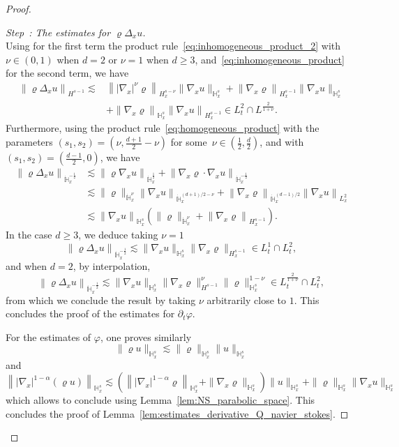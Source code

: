\documentclass[10pt]{amsart}
\theoremstyle{definition}\newtheorem{defi}[theo]{Definition}\newtheorem{rema}[theo]{Remark}\newtheorem{exam}[theo]{Example}\newtheorem{exem}[theo]{Example}\newtheorem{nota}[theo]{Notation}
\newcommand{\bbH}{\mathbb{H}}
\renewcommand*\ge{\geqslant}
\newcounter{stepcount}
\newenvironment{step}[1]{\refstepcounter{stepcount}\begin{proof}[Step~\thestepcount: #1]}{\let\qed\relax\end{proof}}
\begin{document}
\begin{proof}
\begin{step}{{The estimates for $\varrho \Delta_x u$}}
\[\]
Using for the first term the product rule~\eqref{eq:inhomogeneous_product_2} with $\nu \in (0, 1)$ when $d = 2$ or $\nu = 1$ when $d \ge 3$, and~\eqref{eq:inhomogeneous_product} for the second term, we have
\begin{align*}
\left\| \varrho \Delta_x u \right\|_{H^{s-1} } \lesssim &
\left\| | \nabla_x |^\nu \varrho \right\|_{H^{s-\nu}_x} \| \nabla_x u \|_{\bbH^s_x} + \left\| \nabla_x \varrho \right\|_{H^{s-1}_x} \| \nabla_x u \|_{\bbH^s_x} \\
& + \left\| \nabla_x \varrho \right\|_{\bbH^s_x} \left\| \nabla_x u \right\|_{H^{s-1}_x} \in L^2_t \cap L^{ \frac{2}{1 + \nu } }.
\end{align*}
Furthermore, using the product rule~\eqref{eq:homogeneous_product} with the parameters $(s_1, s_2) = (\nu, \frac{ d + 1 }{2} - \nu)$ for some~$\nu \in (\frac{1}{2}, \frac{d}{2})$, and with $(s_1, s_2) = (\frac{d-1}{2}, 0)$, we have
\begin{align*}
\left\| \varrho \Delta_x u \right\|_{ \dot{\bbH}^{-\frac{1}{2}}_x } & \lesssim \left\| \varrho \nabla_x u \right\|_{ \dot{\bbH}^{\frac{1}{2}}_x } + \left\| \nabla_x \varrho \cdot \nabla_x u \right\|_{ \dot{\bbH}^{-\frac{1}{2}}_x } \\
& \lesssim \| \varrho \|_{ \dot{\bbH}^{\nu}_x } \left\| \nabla_x u \right\|_{ \dot{\bbH}^{(d+1)/2 - \nu}_x } + \left\| \nabla_x \varrho \right\|_{ \dot{\bbH}^{(d-1)/2 }_x } \left\| \nabla_x u \right\|_{ L^2_x } \\
& \lesssim\left \| \nabla_x u \right\|_{\bbH^s_x} \left(\| \varrho \|_{ \dot{\bbH}^\nu_x } + \left\| \nabla_x \varrho \right\|_{ H^{s-1}_x } \right).
\end{align*}
In the case $d \ge 3$, we deduce taking $\nu = 1$
\[
\left\| \varrho \Delta_x u \right\|_{ \dot{\bbH}^{-\frac{1}{2}}_x } \lesssim \| \nabla_x u \|_{\bbH^s_x} \| \nabla_x \varrho \|_{ H^{s-1}_x } \in L^1_t \cap L^2_t,
\]
and when $d = 2$, by interpolation,
\[
\left\| \varrho \Delta_x u \right\|_{ \dot{\bbH}^{-\frac{1}{2}}_x } \lesssim \| \nabla_x u \|_{\bbH^s_x} \| \nabla_x \varrho \|_{ H^{s-1} }^\nu \| \varrho \|_{ \bbH^s_x }^{1-\nu} \in L^{\frac{2}{1+\nu}}_t \cap L^2_t,
\]
from which we conclude the result by taking $\nu$ arbitrarily close to $1$. This concludes the proof of the estimates for $\partial_t \varphi$.

For the estimates of $\varphi$, one proves similarly
\[
\| \varrho u \|_{ \bbH^s_x } \lesssim \| \varrho \|_{ \bbH^s_x } \| u \|_{ \bbH^s_x }
\]
and
\[
\left\| | \nabla_x |^{1 - \alpha} (\varrho u) \right\|_{ \bbH^s_x } \lesssim \left(\left\| | \nabla_x |^{1 - \alpha} \varrho \right\|_{ \bbH^s_x } + \| \nabla_x \varrho \|_{ \bbH^s_x } \right) \| u \|_{ \bbH^s_x } + \| \varrho \|_{ \bbH^s_x } \| \nabla_x u \|_{ \bbH^s_x }
\]
which allows to conclude using Lemma~\ref{lem:NS_parabolic_space}. This concludes the proof of Lemma~\ref{lem:estimates_derivative_Q_navier_stokes}.\qedhere
\end{step}\let\qed\relax
\end{proof}
\end{document}
